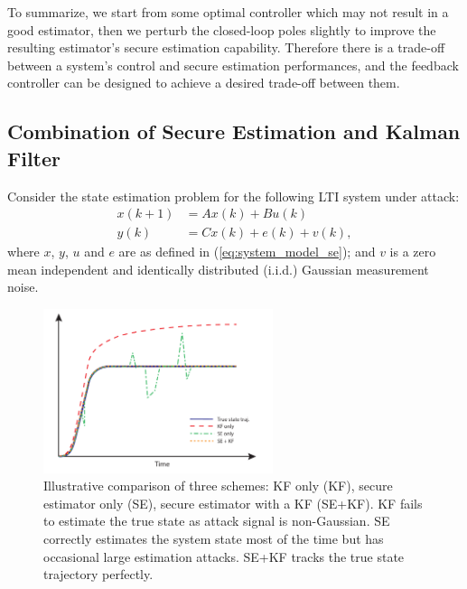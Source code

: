 \documentclass[../../thesis.tex]{subfiles}
\begin{document}
To summarize, we start from some optimal controller which may not result in a good estimator, then we perturb the closed-loop poles slightly to improve the resulting estimator's secure estimation capability. Therefore there is a trade-off between a system's control and secure estimation performances, and the feedback controller can be designed to achieve a desired trade-off between them.


\subsection{Combination of Secure Estimation and Kalman Filter}\label{sec:estimation}
Consider the state estimation problem for the following LTI system under attack:
\begin{equation}
\begin{aligned}
x(k+1) & = A x(k) + B u(k)\\
y(k) & = C x(k) + e(k) + v(k),
\end{aligned}
\end{equation}
where $x$, $y$, $u$ and $e$ are as defined in (\ref{eq:system_model_se}); and $v$ is a zero mean independent and identically distributed (i.i.d.) Gaussian measurement noise. 


\begin{figure}
\center
\includegraphics[width=0.6\textwidth]{chapters/se_linear/figures/qh/est_illu.pdf}
\caption{Illustrative comparison of three schemes: KF only (KF), secure estimator only (SE), secure estimator with a KF (SE+KF). KF fails to estimate the true state as attack signal is non-Gaussian. SE correctly estimates the system state most of the time but has occasional large estimation attacks. SE+KF tracks the true state trajectory perfectly.}
\label{fig:estimation}
\end{figure}
\end{document}
